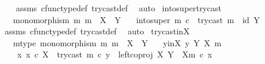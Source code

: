 \begin{isabellebody}
%
\isadelimproof
\ \ %
\endisadelimproof
%
\isatagproof
{}\isamarkupfalse%
\ assms\ cfunc{\isacharunderscore}{\kern0pt}type{\isacharunderscore}{\kern0pt}def\ try{\isacharunderscore}{\kern0pt}cast{\isacharunderscore}{\kern0pt}def{}\ \isamarkupfalse%
\ auto%
\endisatagproof
{\isafoldproof}%
%
\isadelimproof
\isanewline
%
\endisadelimproof
\isanewline
{}\isamarkupfalse%
\ into{\isacharunderscore}{\kern0pt}super{\isacharunderscore}{\kern0pt}try{\isacharunderscore}{\kern0pt}cast{\isacharcolon}{\kern0pt}\isanewline
\ \ \ {\isachardoublequoteopen}monomorphism\ m{\isachardoublequoteclose}\ {\isachardoublequoteopen}m\ {\isacharcolon}{\kern0pt}\ X\ {\isasymrightarrow}\ Y{\isachardoublequoteclose}\isanewline
\ \ \ {\isachardoublequoteopen}into{\isacharunderscore}{\kern0pt}super\ m\ {\isasymcirc}\isactrlsub c\ \ try{\isacharunderscore}{\kern0pt}cast\ m\ {\isacharequal}{\kern0pt}\ id\ Y{\isachardoublequoteclose}\isanewline
%
\isadelimproof
\ \ %
\endisadelimproof
%
\isatagproof
{}\isamarkupfalse%
\ assms\ cfunc{\isacharunderscore}{\kern0pt}type{\isacharunderscore}{\kern0pt}def\ try{\isacharunderscore}{\kern0pt}cast{\isacharunderscore}{\kern0pt}def{}\ \isamarkupfalse%
\ auto%
\endisatagproof
{\isafoldproof}%
%
\isadelimproof
\isanewline
%
\endisadelimproof
\isanewline
{}\isamarkupfalse%
\ try{\isacharunderscore}{\kern0pt}cast{\isacharunderscore}{\kern0pt}in{\isacharunderscore}{\kern0pt}X{\isacharcolon}{\kern0pt}\isanewline
\ \ \ m{\isacharunderscore}{\kern0pt}type{\isacharcolon}{\kern0pt}\ {\isachardoublequoteopen}monomorphism\ m{\isachardoublequoteclose}\ {\isachardoublequoteopen}m\ {\isacharcolon}{\kern0pt}\ X\ {\isasymrightarrow}\ Y{\isachardoublequoteclose}\isanewline
\ \ \ y{\isacharunderscore}{\kern0pt}in{\isacharunderscore}{\kern0pt}X{\isacharcolon}{\kern0pt}\ {\isachardoublequoteopen}y\ {\isasymin}\isactrlbsub Y\isactrlesub \ {\isacharparenleft}{\kern0pt}X{\isacharcomma}{\kern0pt}\ m{\isacharparenright}{\kern0pt}{\isachardoublequoteclose}\isanewline
\ \ \ {\isachardoublequoteopen}{\isasymexists}\ x{\isachardot}{\kern0pt}\ x\ {\isasymin}\isactrlsub c\ X\ {\isasymand}\ try{\isacharunderscore}{\kern0pt}cast\ m\ {\isasymcirc}\isactrlsub c\ y\ {\isacharequal}{\kern0pt}\ left{\isacharunderscore}{\kern0pt}coproj\ X\ {\isacharparenleft}{\kern0pt}Y\ {\isasymsetminus}\ {\isacharparenleft}{\kern0pt}X{\isacharcomma}{\kern0pt}m{\isacharparenright}{\kern0pt}{\isacharparenright}{\kern0pt}\ {\isasymcirc}\isactrlsub c\ x{\isachardoublequoteclose}\isanewline

\end{isabellebody}
